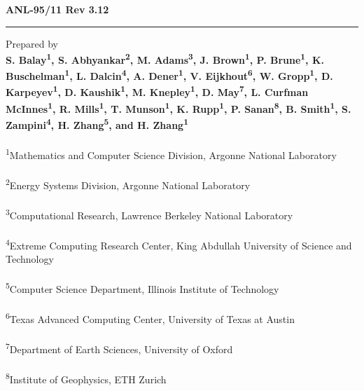 \pagestyle{empty}
\hfill {\large {\bf ANL-95/11 Rev 3.12}}

\vspace*{2in}
\vspace*{8pt}
\hrule
\vspace*{8pt}

\vspace*{0.5in}
\noindent Prepared by \\
{\bf S. Balay\textsuperscript{1}, S. Abhyankar\textsuperscript{2}, M. Adams\textsuperscript{3}, J. Brown\textsuperscript{1}, P. Brune\textsuperscript{1}, K. Buschelman\textsuperscript{1},
L. Dalcin\textsuperscript{4}, A. Dener\textsuperscript{1}, V. Eijkhout\textsuperscript{6}, W. Gropp\textsuperscript{1}, D. Karpeyev\textsuperscript{1},
D. Kaushik\textsuperscript{1}, M. Knepley\textsuperscript{1}, D. May\textsuperscript{7}, L. Curfman McInnes\textsuperscript{1}, R. Mills\textsuperscript{1}, T. Munson\textsuperscript{1},
K. Rupp\textsuperscript{1}, P. Sanan\textsuperscript{8}, B. Smith\textsuperscript{1}, S. Zampini\textsuperscript{4}, H. Zhang\textsuperscript{5}, and H. Zhang\textsuperscript{1}}\\
\\
\textsuperscript{1}Mathematics and Computer Science Division, Argonne National Laboratory \\
\\
\textsuperscript{2}Energy Systems Division, Argonne National Laboratory \\
\\
\textsuperscript{3}Computational Research, Lawrence Berkeley National Laboratory \\
\\
\textsuperscript{4}Extreme Computing Research Center, King Abdullah University of Science and Technology\\
\\
\textsuperscript{5}Computer Science Department, Illinois Institute of Technology\\
\\
\textsuperscript{6}Texas Advanced Computing Center, University of Texas at Austin\\
\\
\textsuperscript{7}Department of Earth Sciences, University of Oxford\\
\\
\textsuperscript{8}Institute of Geophysics, ETH Zurich\\


